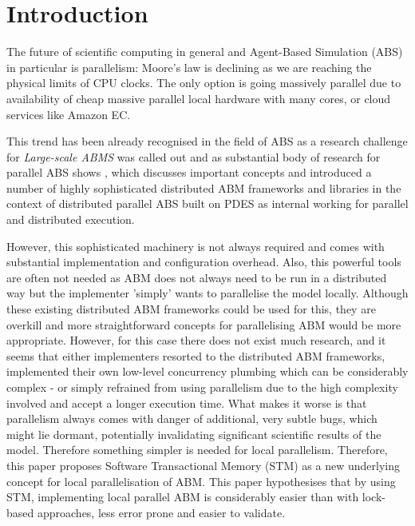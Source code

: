 \section{Introduction} %
The future of scientific computing in general and Agent-Based Simulation (ABS) in particular is parallelism: Moore's law is declining as we are reaching the physical limits of CPU clocks. The only option is going massively parallel due to availability of cheap massive parallel local hardware with many cores, or cloud services like Amazon EC.

This trend has been already recognised in the field of ABS as a research challenge for \textit{Large-scale ABMS} \cite{macal_everything_2016} was called out and as substantial body of research for parallel ABS shows \cite{suryanarayanan_pdes-mas_2013, logan_distributed_2001, lees_using_2008, suryanarayanan_synchronised_2013, riley_next_2003, gasser_mace3j:_2002, himmelspach_plugn_2007, minson_distributing_2008, gorur_repast_2016, hay_experiments_2015, abar_agent_2017, cicirelli_efficient_2015}, which discusses important concepts and introduced a number of highly sophisticated distributed ABM frameworks and libraries in the context of distributed parallel ABS built on PDES as internal working for parallel and distributed execution.

However, this sophisticated machinery is not always required and comes with substantial implementation and configuration overhead. Also, this powerful tools are often not needed as ABM does not always need to be run in a distributed way but the implementer 'simply' wants to parallelise the model locally. Although these existing distributed ABM frameworks could be used for this, they are overkill and more straightforward concepts for parallelising ABM would be more appropriate. However, for this case there does not exist much research, and it seems that either implementers resorted to the distributed ABM frameworks, implemented their own low-level concurrency plumbing which can be considerably complex - or simply refrained from using parallelism due to the high complexity involved and accept a longer execution time. What makes it worse is that parallelism always comes with danger of additional, very subtle bugs, which might lie dormant, potentially invalidating significant scientific results of the model. Therefore something simpler is needed for local parallelism.
Therefore, this paper proposes Software Transactional Memory (STM) as a new underlying concept for local parallelisation of ABM. This paper hypothesises that by using STM, implementing local parallel ABM is considerably easier than with lock-based approaches, less error prone and easier to validate. 

